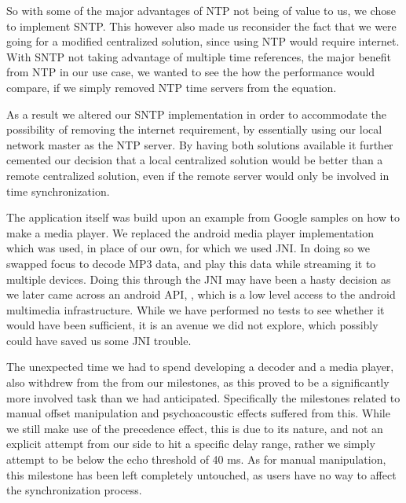 
So with some of the major advantages of \ac{NTP} not being of value to us, we chose to implement \ac{SNTP}.
This however also made us reconsider the fact that we were going for a modified centralized solution, since using \ac{NTP} would require internet.
With \ac{SNTP} not taking advantage of multiple time references, the major benefit from \ac{NTP} in our use case, we wanted to see the how the performance would compare, if we simply removed \ac{NTP} time servers from the equation.

As a result we altered our \ac{SNTP} implementation in order to accommodate the possibility of removing the internet requirement, by essentially using our local network master as the \ac{NTP} server.
By having both solutions available it further cemented our decision that a local centralized solution would be better than a remote centralized solution, even if the remote server would only be involved in time synchronization.

\bigskip
The application itself was build upon an example from Google samples on how to make a media player.
We replaced the android media player implementation which was used, in place of our own, for which we used \ac{JNI}.
In doing so we swapped focus to decode MP3 data, and play this data while streaming it to multiple devices.
Doing this through the \ac{JNI} may have been a hasty decision as we later came across an android API, , which is a low level access to the android multimedia infrastructure.
While we have performed no tests to see whether it would have been sufficient, it is an avenue we did not explore, which possibly could have saved us some \ac{JNI} trouble.

The unexpected time we had to spend developing a decoder and a media player, also withdrew from the from our milestones, as this proved to be a significantly more involved task than we had anticipated.
Specifically the milestones related to manual offset manipulation and psychoacoustic effects suffered from this.
While we still make use of the precedence effect, this is due to its nature, and not an explicit attempt from our side to hit a specific delay range, rather we simply attempt to be below the echo threshold of 40 ms.
As for manual manipulation, this milestone has been left completely untouched, as users have no way to affect the synchronization process.

